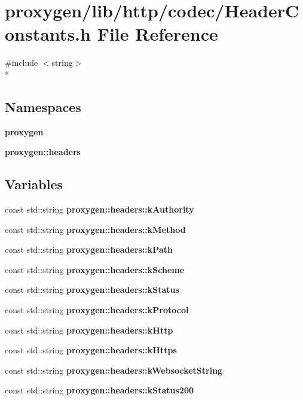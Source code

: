 \section{proxygen/lib/http/codec/\+Header\+Constants.h File Reference}
\label{HeaderConstants_8h}
{\ttfamily \#include $<$string$>$}\\*
\subsection*{Namespaces}
\begin{DoxyCompactItemize}
\item 
 {\bf proxygen}
\item 
 {\bf proxygen\+::headers}
\end{DoxyCompactItemize}
\subsection*{Variables}
\begin{DoxyCompactItemize}
\item 
const std\+::string {\bf proxygen\+::headers\+::k\+Authority}
\item 
const std\+::string {\bf proxygen\+::headers\+::k\+Method}
\item 
const std\+::string {\bf proxygen\+::headers\+::k\+Path}
\item 
const std\+::string {\bf proxygen\+::headers\+::k\+Scheme}
\item 
const std\+::string {\bf proxygen\+::headers\+::k\+Status}
\item 
const std\+::string {\bf proxygen\+::headers\+::k\+Protocol}
\item 
const std\+::string {\bf proxygen\+::headers\+::k\+Http}
\item 
const std\+::string {\bf proxygen\+::headers\+::k\+Https}
\item 
const std\+::string {\bf proxygen\+::headers\+::k\+Websocket\+String}
\item 
const std\+::string {\bf proxygen\+::headers\+::k\+Status200}
\end{DoxyCompactItemize}
